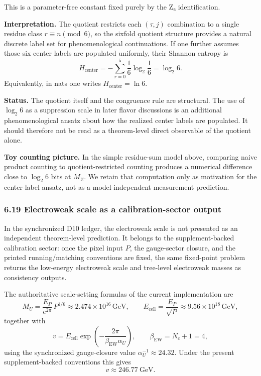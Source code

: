 This is a parameter-free constant fixed purely by the Z₆ identification.

\textbf{Interpretation.} The quotient restricts each \((\tau, j)\) combination to a single residue class \(r \equiv n \pmod 6\), so the sixfold quotient structure provides a natural discrete label set for phenomenological continuations. If one further assumes those six center labels are populated uniformly, their Shannon entropy is
\[
H_{\mathrm{center}}
=
-\sum_{r=0}^{5}\frac{1}{6}\log_2\!\frac{1}{6}
=
\log_2 6.
\]
Equivalently, in nats one writes \(H_{\mathrm{center}} = \ln 6\).

\textbf{Status.} The quotient itself and the congruence rule are structural. The use of \(\log_2 6\) as a suppression scale in later flavor discussions is an additional phenomenological ansatz about how the realized center labels are populated. It should therefore not be read as a theorem-level direct observable of the quotient alone.

\textbf{Toy counting picture.} In the simple residue-sum model above, comparing naive product counting to quotient-restricted counting produces a numerical difference close to \(\log_2 6\) bits at \(M_Z\). We retain that computation only as motivation for the center-label ansatz, not as a model-independent measurement prediction.

\subsubsection{6.19 Electroweak scale as a calibration-sector output}\label{619-electroweak-scale-from-dimensional-transmutation}

In the synchronized D10 ledger, the electroweak scale is not presented as an independent theorem-level prediction. It belongs to the supplement-backed calibration sector: once the pixel input \(P\), the gauge-sector closure, and the printed running/matching conventions are fixed, the same fixed-point problem returns the low-energy electroweak scale and tree-level electroweak masses as consistency outputs.

The authoritative scale-setting formulas of the current implementation are
\[
M_U=\frac{E_P}{e^{2\pi}}\,P^{1/6}\approx 2.474\times 10^{16}\,\mathrm{GeV},
\qquad
E_{\mathrm{cell}}=\frac{E_P}{\sqrt P}\approx 9.56\times 10^{18}\,\mathrm{GeV},
\]
together with
\[
v=E_{\mathrm{cell}}\exp\!\left(-\frac{2\pi}{\beta_{\mathrm{EW}}\alpha_U}\right),
\qquad
\beta_{\mathrm{EW}}=N_c+1=4,
\]
using the synchronized gauge-closure value \(\alpha_U^{-1}\approx 24.32\). Under the present supplement-backed conventions this gives
\[
v\approx 246.77\ \mathrm{GeV}.
\]

